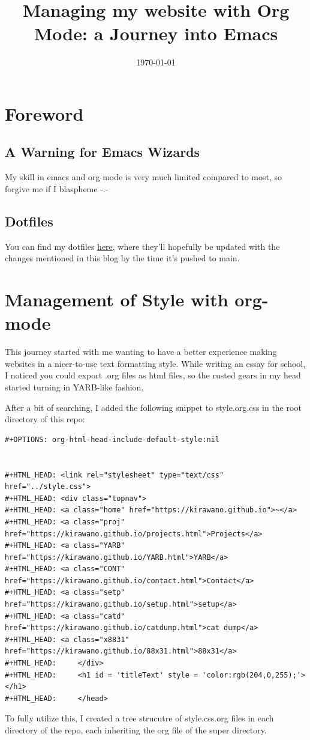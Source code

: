 \documentclass[11pt]{article}
\date{\today}
\title{Managing my website with Org Mode: a Journey into Emacs}
\begin{document}
\maketitle
\tableofcontents

\section{Foreword}
\label{sec:orgd93711e}
\subsection{A Warning for Emacs Wizards}
\label{sec:orgba54347}
My skill in emacs and org mode is very much limited compared to most, so forgive me if I blaspheme -.-
\subsection{Dotfiles}
\label{sec:org1fb66cc}
You can find my dotfiles \href{https://kirawano.github.io/doom-kira}{here}, where they'll hopefully be updated with the changes mentioned in this blog by the time it's pushed to main.
\section{Management of Style with org-mode}
\label{sec:org4dd2793}
This journey started with me wanting to have a better experience making websites in a nicer-to-use text formatting style. While writing an essay for school, I noticed you could export .org files as html files, so the rusted gears in my head started turning in YARB-like fashion.

After a bit of searching, I added the following snippet to style.org.css in the root directory of this repo:

\begin{verbatim}
#+OPTIONS: org-html-head-include-default-style:nil


#+HTML_HEAD: <link rel="stylesheet" type="text/css" href="../style.css"> 
#+HTML_HEAD: <div class="topnav">
#+HTML_HEAD: <a class="home" href="https://kirawano.github.io">~</a>
#+HTML_HEAD: <a class="proj" href="https://kirawano.github.io/projects.html">Projects</a>
#+HTML_HEAD: <a class="YARB" href="https://kirawano.github.io/YARB.html">YARB</a>
#+HTML_HEAD: <a class="CONT" href="https://kirawano.github.io/contact.html">Contact</a>
#+HTML_HEAD: <a class="setp" href="https://kirawano.github.io/setup.html">setup</a>
#+HTML_HEAD: <a class="catd" href="https://kirawano.github.io/catdump.html">cat dump</a>
#+HTML_HEAD: <a class="x8831" href="https://kirawano.github.io/88x31.html">88x31</a>
#+HTML_HEAD:     </div>
#+HTML_HEAD:     <h1 id = 'titleText' style = 'color:rgb(204,0,255);'></h1>
#+HTML_HEAD:     </head>
\end{verbatim}

To fully utilize this, I created a tree strucutre of style.css.org files in each directory of the repo, each inheriting the org file of the super directory.
\end{document}
